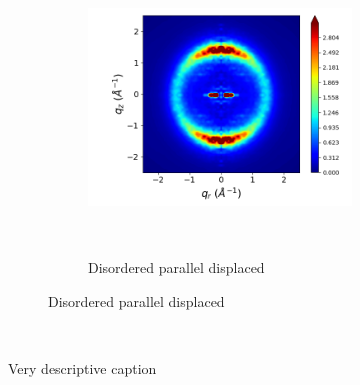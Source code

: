 \documentclass{article}
\begin{document}
\begin{figure}[htb]
\begin{subfigure}{0.28\linewidth}
			\begin{subfigure}{\textwidth}
			\centering
		        	\includegraphics[width=\linewidth]{rzplot_offset_300K_disorder_jet.png}
			        \caption{Disordered parallel displaced}~\label{fig:rzplot_offset_300K_disordered}
			\end{subfigure}
	\end{subfigure}
	\caption{Very descriptive caption}~\label{fig:XRDsim} 
	\end{figure}
\end{document}
